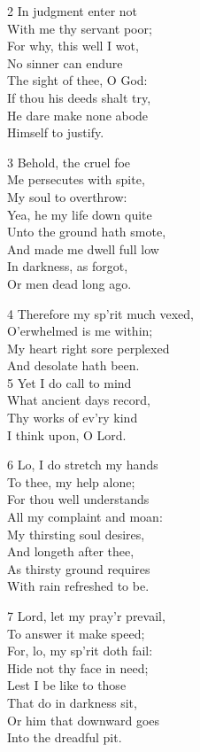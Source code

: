 2 In judgment enter not\\
With me thy servant poor;\\
For why, this well I wot,\\
No sinner can endure\\
The sight of thee, O God:\\
If thou his deeds shalt try,\\
He dare make none abode\\
Himself to justify.

3 Behold, the cruel foe\\
Me persecutes with spite,\\
My soul to overthrow:\\
Yea, he my life down quite\\
Unto the ground hath smote,\\
And made me dwell full low\\
In darkness, as forgot,\\
Or men dead long ago.

4 Therefore my sp’rit much vexed,\\
O’erwhelmed is me within;\\
My heart right sore perplexed\\
And desolate hath been.\\
5 Yet I do call to mind\\
What ancient days record,\\
Thy works of ev’ry kind\\
I think upon, O Lord.

6 Lo, I do stretch my hands\\
To thee, my help alone;\\
For thou well understands\\
All my complaint and moan:\\
My thirsting soul desires,\\
And longeth after thee,\\
As thirsty ground requires\\
With rain refreshed to be.

7 Lord, let my pray’r prevail,\\
To answer it make speed;\\
For, lo, my sp’rit doth fail:\\
Hide not thy face in need;\\
Lest I be like to those\\
That do in darkness sit,\\
Or him that downward goes\\
Into the dreadful pit.

